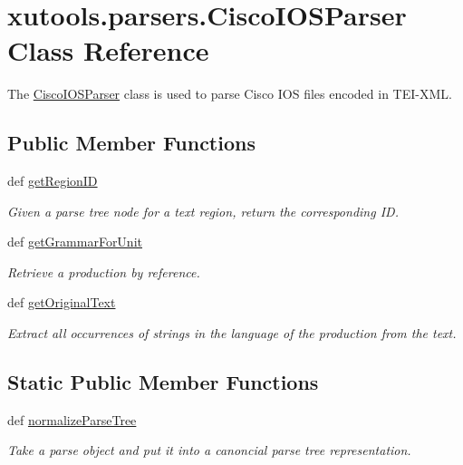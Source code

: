 \hypertarget{classxutools_1_1parsers_1_1_cisco_i_o_s_parser}{\section{xutools.\-parsers.\-Cisco\-I\-O\-S\-Parser Class Reference}
\label{classxutools_1_1parsers_1_1_cisco_i_o_s_parser}
}


The \hyperlink{classxutools_1_1parsers_1_1_cisco_i_o_s_parser}{Cisco\-I\-O\-S\-Parser} class is used to parse Cisco I\-O\-S files encoded in T\-E\-I-\/\-X\-M\-L.  


\subsection*{Public Member Functions}
\begin{DoxyCompactItemize}
\item 
def \hyperlink{classxutools_1_1parsers_1_1_cisco_i_o_s_parser_a7b91f534ff7939f0816424df94c4173d}{get\-Region\-I\-D}
\begin{DoxyCompactList}\small\item\em Given a parse tree node for a text region, return the corresponding I\-D. \end{DoxyCompactList}\item 
def \hyperlink{classxutools_1_1parsers_1_1_cisco_i_o_s_parser_a3156eda3722d12fba7b6e2eda911f0ce}{get\-Grammar\-For\-Unit}
\begin{DoxyCompactList}\small\item\em Retrieve a production by reference. \end{DoxyCompactList}\item 
def \hyperlink{classxutools_1_1parsers_1_1_cisco_i_o_s_parser_ad06a64ca65d9cd9252322951cd999163}{get\-Original\-Text}
\begin{DoxyCompactList}\small\item\em Extract all occurrences of strings in the language of the production from the text. \end{DoxyCompactList}\end{DoxyCompactItemize}
\subsection*{Static Public Member Functions}
\begin{DoxyCompactItemize}
\item 
def \hyperlink{classxutools_1_1parsers_1_1_cisco_i_o_s_parser_abd5b825dc730891907b538ac00c5bfb3}{normalize\-Parse\-Tree}
\begin{DoxyCompactList}\small\item\em Take a parse object and put it into a canoncial parse tree representation. \end{DoxyCompactList}\end{DoxyCompactItemize}
